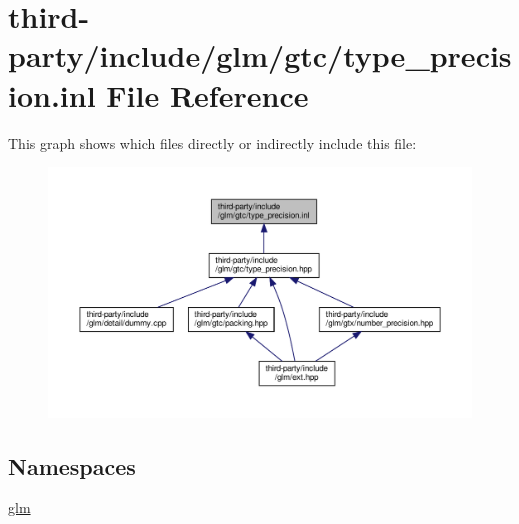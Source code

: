 \hypertarget{type__precision_8inl}{}\section{third-\/party/include/glm/gtc/type\+\_\+precision.inl File Reference}
\label{type__precision_8inl}
This graph shows which files directly or indirectly include this file\+:
\nopagebreak
\begin{figure}[H]
\begin{center}
\leavevmode
\includegraphics[width=350pt]{type__precision_8inl__dep__incl}
\end{center}
\end{figure}
\subsection*{Namespaces}
\begin{DoxyCompactItemize}
\item 
 \hyperlink{namespaceglm}{glm}
\end{DoxyCompactItemize}
